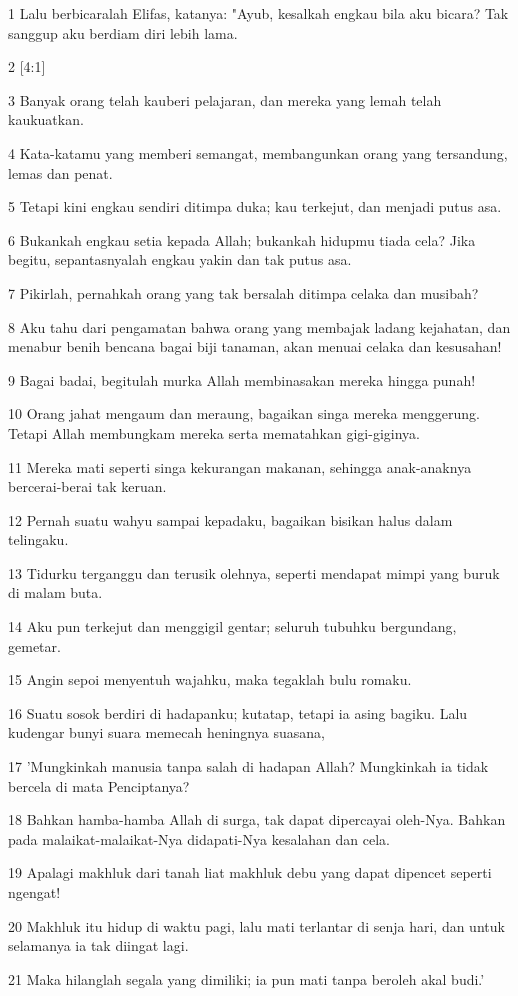 \par 1 Lalu berbicaralah Elifas, katanya: "Ayub, kesalkah engkau bila aku bicara? Tak sanggup aku berdiam diri lebih lama.
\par 2 [4:1]
\par 3 Banyak orang telah kauberi pelajaran, dan mereka yang lemah telah kaukuatkan.
\par 4 Kata-katamu yang memberi semangat, membangunkan orang yang tersandung, lemas dan penat.
\par 5 Tetapi kini engkau sendiri ditimpa duka; kau terkejut, dan menjadi putus asa.
\par 6 Bukankah engkau setia kepada Allah; bukankah hidupmu tiada cela? Jika begitu, sepantasnyalah engkau yakin dan tak putus asa.
\par 7 Pikirlah, pernahkah orang yang tak bersalah ditimpa celaka dan musibah?
\par 8 Aku tahu dari pengamatan bahwa orang yang membajak ladang kejahatan, dan menabur benih bencana bagai biji tanaman, akan menuai celaka dan kesusahan!
\par 9 Bagai badai, begitulah murka Allah membinasakan mereka hingga punah!
\par 10 Orang jahat mengaum dan meraung, bagaikan singa mereka menggerung. Tetapi Allah membungkam mereka serta mematahkan gigi-giginya.
\par 11 Mereka mati seperti singa kekurangan makanan, sehingga anak-anaknya bercerai-berai tak keruan.
\par 12 Pernah suatu wahyu sampai kepadaku, bagaikan bisikan halus dalam telingaku.
\par 13 Tidurku terganggu dan terusik olehnya, seperti mendapat mimpi yang buruk di malam buta.
\par 14 Aku pun terkejut dan menggigil gentar; seluruh tubuhku bergundang, gemetar.
\par 15 Angin sepoi menyentuh wajahku, maka tegaklah bulu romaku.
\par 16 Suatu sosok berdiri di hadapanku; kutatap, tetapi ia asing bagiku. Lalu kudengar bunyi suara memecah heningnya suasana,
\par 17 'Mungkinkah manusia tanpa salah di hadapan Allah? Mungkinkah ia tidak bercela di mata Penciptanya?
\par 18 Bahkan hamba-hamba Allah di surga, tak dapat dipercayai oleh-Nya. Bahkan pada malaikat-malaikat-Nya didapati-Nya kesalahan dan cela.
\par 19 Apalagi makhluk dari tanah liat makhluk debu yang dapat dipencet seperti ngengat!
\par 20 Makhluk itu hidup di waktu pagi, lalu mati terlantar di senja hari, dan untuk selamanya ia tak diingat lagi.
\par 21 Maka hilanglah segala yang dimiliki; ia pun mati tanpa beroleh akal budi.'

